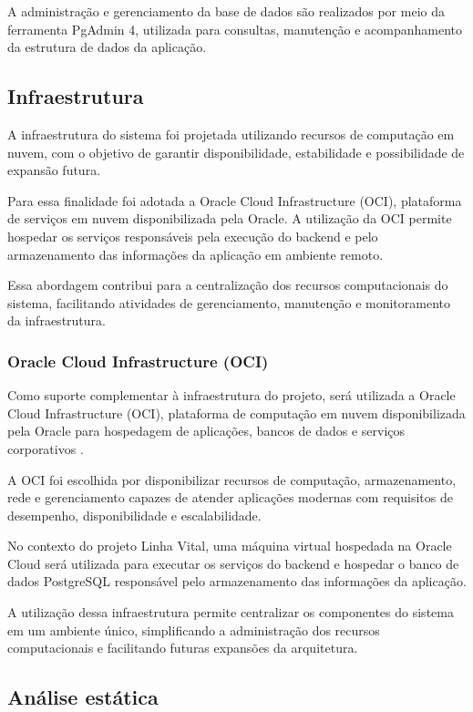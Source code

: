 A administração e gerenciamento da base de dados são realizados por meio da ferramenta PgAdmin 4, utilizada para consultas, manutenção e acompanhamento da estrutura de dados da aplicação.

\subsection{Infraestrutura}

A infraestrutura do sistema foi projetada utilizando recursos de computação em nuvem, com o objetivo de garantir disponibilidade, estabilidade e possibilidade de expansão futura.

Para essa finalidade foi adotada a Oracle Cloud Infrastructure (OCI), plataforma de serviços em nuvem disponibilizada pela Oracle. A utilização da OCI permite hospedar os serviços responsáveis pela execução do backend e pelo armazenamento das informações da aplicação em ambiente remoto.

Essa abordagem contribui para a centralização dos recursos computacionais do sistema, facilitando atividades de gerenciamento, manutenção e monitoramento da infraestrutura.

\subsubsection{Oracle Cloud Infrastructure (OCI)}

Como suporte complementar à infraestrutura do projeto, será utilizada a Oracle Cloud Infrastructure (OCI), plataforma de computação em nuvem disponibilizada pela Oracle para hospedagem de aplicações, bancos de dados e serviços corporativos \cite{oracleoci2026}.

A OCI foi escolhida por disponibilizar recursos de computação, armazenamento, rede e gerenciamento capazes de atender aplicações modernas com requisitos de desempenho, disponibilidade e escalabilidade.

No contexto do projeto Linha Vital, uma máquina virtual hospedada na Oracle Cloud será utilizada para executar os serviços do backend e hospedar o banco de dados PostgreSQL responsável pelo armazenamento das informações da aplicação.

A utilização dessa infraestrutura permite centralizar os componentes do sistema em um ambiente único, simplificando a administração dos recursos computacionais e facilitando futuras expansões da arquitetura.

\subsection{Análise estática}

